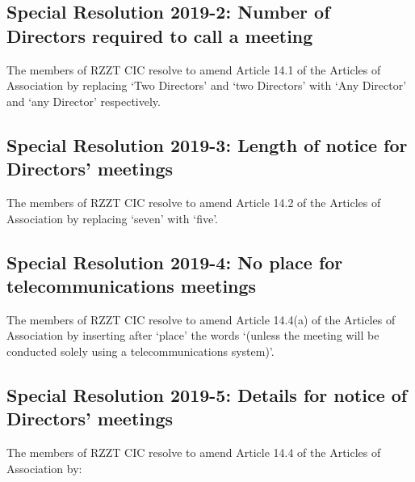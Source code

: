\documentclass[a4paper,10pt]{article}
\begin{document}
\subsection{Special Resolution 2019-2: Number of Directors required to call a meeting}

The members of RZZT CIC resolve to amend Article 14.1 of the Articles of Association by replacing `Two Directors' and `two Directors' with `Any Director' and `any Director' respectively.

\subsection{Special Resolution 2019-3: Length of notice for Directors' meetings}

The members of RZZT CIC resolve to amend Article 14.2 of the Articles of Association by replacing `seven' with `five'.

\subsection{Special Resolution 2019-4: No place for telecommunications meetings}

The members of RZZT CIC resolve to amend Article 14.4(a) of the Articles of Association by inserting after `place' the words `(unless the meeting will be conducted solely using a telecommunications system)'.

\subsection{Special Resolution 2019-5: Details for notice of Directors' meetings}

The members of RZZT CIC resolve to amend Article 14.4 of the Articles of Association by:
\end{document}
